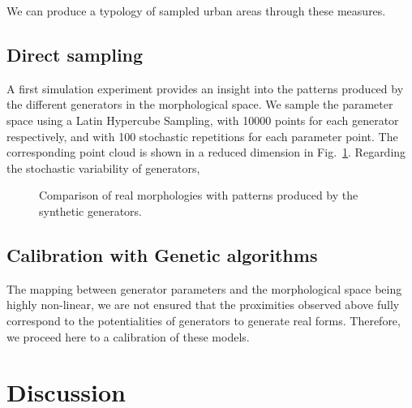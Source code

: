 \documentclass[letterpaper]{article}
\begin{document}
We can produce a typology of sampled urban areas through these measures.






\subsection{Direct sampling}

A first simulation experiment provides an insight into the patterns produced by the different generators in the morphological space. We sample the parameter space using a Latin Hypercube Sampling, with 10000 points for each generator respectively, and with 100 stochastic repetitions for each parameter point. The corresponding point cloud is shown in a reduced dimension in Fig.~\ref{fig:lhs}. Regarding the stochastic variability of generators, 

\begin{figure}
    \centering
    \caption{Comparison of real morphologies with patterns produced by the synthetic generators.}
    \label{fig:lhs}
\end{figure}


\subsection{Calibration with Genetic algorithms}

The mapping between generator parameters and the morphological space being highly non-linear, we are not ensured that the proximities observed above fully correspond to the potentialities of generators to generate real forms. Therefore, we proceed here to a calibration of these models.



\section{Discussion} \label{sec:discussion}

\end{document}
